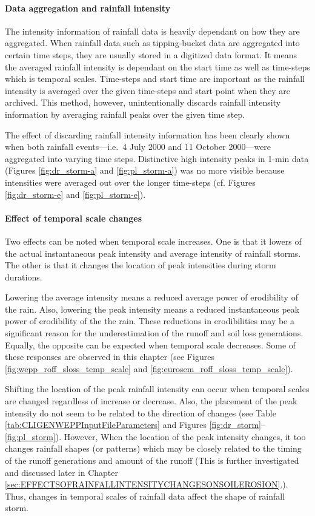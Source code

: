 \paragraph{Data aggregation and rainfall intensity} The intensity information
of rainfall data is heavily dependant on how they are aggregated. When rainfall
data such as tipping-bucket data are aggregated into certain time steps, they
are usually stored in a digitized data format. It means the averaged rainfall
intensity is dependant on the start time as well as time-steps which is temporal
scales. Time-steps and start time are important as the rainfall intensity is
averaged over the given time-steps and start point when they are archived. This
method, however, unintentionally discards rainfall intensity information by
averaging rainfall peaks over the given time step.

The effect of discarding rainfall intensity information has been clearly shown
when both rainfall events---i.e.\ 4 July 2000 and 11 October 2000---were
aggregated into varying time steps. Distinctive high intensity peaks in 1-min
data (Figures \ref{fig:dr_storm-a} and \ref{fig:pl_storm-a}) was no more visible
because intensities were averaged out over the longer time-steps (cf. Figures
\ref{fig:dr_storm-e} and \ref{fig:pl_storm-e}).

\paragraph{Effect of temporal scale changes} Two effects can be noted when
temporal scale increases. One is that it lowers of the actual instantaneous peak
intensity and average intensity of rainfall storms. The other is that it
changes the location of peak intensities during storm durations.

Lowering the average intensity means a reduced average power of erodibility
of the rain. Also, lowering the peak intensity means a reduced instantaneous
peak power of erodibility of the the rain. These reductions in erodibilities may
be a significant reason for the underestimation of the runoff and soil loss
generations. Equally, the opposite can be expected when temporal scale
decreases. Some of these responses are observed in this chapter (see Figures
\ref{fig:wepp_roff_sloss_temp_scale} and
\ref{fig:eurosem_roff_sloss_temp_scale}).

Shifting the location of the peak rainfall intensity can occur when temporal
scales are changed regardless of increase or decrease. Also, the placement of
the peak intensity do not seem to be related to the direction of changes (see
Table \ref{tab:CLIGENWEPPInputFileParameters} and Figures
\ref{fig:dr_storm}--\ref{fig:pl_storm}). However, When the location of the peak
intensity changes, it too changes rainfall shapes (or patterns) which may be
closely related to the timing of the runoff generations and amount of the runoff
(This is further investigated and discussed later in Chapter
\ref{sec:EFFECTSOFRAINFALLINTENSITYCHANGESONSOILEROSION}.). Thus, changes in
temporal scales of rainfall data affect the shape of rainfall storm.

